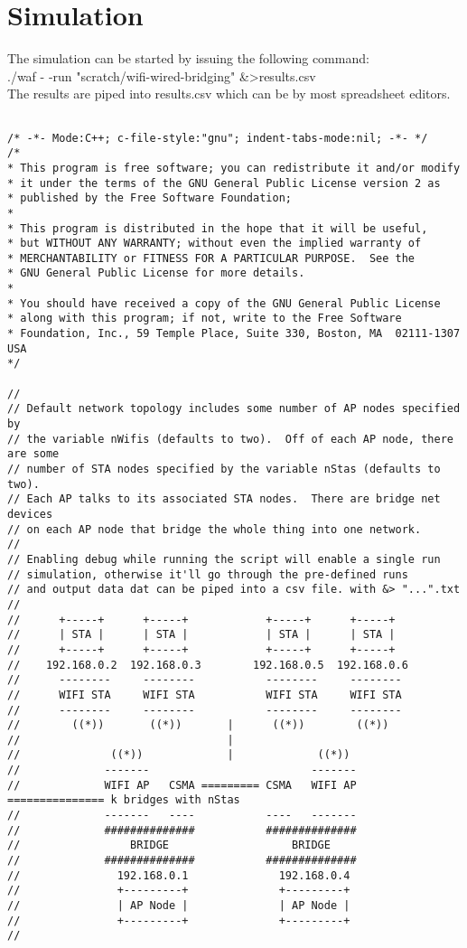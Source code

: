 \chapter{Simulation} 

The simulation can be started by issuing the following command:\\

./waf - -run "scratch/wifi-wired-bridging" \&>results.csv\\

The results are piped into results.csv which can be by most spreadsheet 
editors.

\begin{lstlisting}

/* -*- Mode:C++; c-file-style:"gnu"; indent-tabs-mode:nil; -*- */
/*
* This program is free software; you can redistribute it and/or modify
* it under the terms of the GNU General Public License version 2 as
* published by the Free Software Foundation;
*
* This program is distributed in the hope that it will be useful,
* but WITHOUT ANY WARRANTY; without even the implied warranty of
* MERCHANTABILITY or FITNESS FOR A PARTICULAR PURPOSE.  See the
* GNU General Public License for more details.
*
* You should have received a copy of the GNU General Public License
* along with this program; if not, write to the Free Software
* Foundation, Inc., 59 Temple Place, Suite 330, Boston, MA  02111-1307  USA
*/

//
// Default network topology includes some number of AP nodes specified by
// the variable nWifis (defaults to two).  Off of each AP node, there are some
// number of STA nodes specified by the variable nStas (defaults to two).
// Each AP talks to its associated STA nodes.  There are bridge net devices
// on each AP node that bridge the whole thing into one network.
//
// Enabling debug while running the script will enable a single run
// simulation, otherwise it'll go through the pre-defined runs
// and output data dat can be piped into a csv file. with &> "...".txt
//
//      +-----+      +-----+            +-----+      +-----+
//      | STA |      | STA |            | STA |      | STA | 
//      +-----+      +-----+            +-----+      +-----+
//    192.168.0.2  192.168.0.3        192.168.0.5  192.168.0.6
//      --------     --------           --------     --------
//      WIFI STA     WIFI STA           WIFI STA     WIFI STA
//      --------     --------           --------     --------
//        ((*))       ((*))       |      ((*))        ((*))
//                                |
//              ((*))             |             ((*))
//             -------                         -------
//             WIFI AP   CSMA ========= CSMA   WIFI AP  =============== k bridges with nStas
//             -------   ----           ----   -------
//             ##############           ##############
//                 BRIDGE                   BRIDGE
//             ##############           ############## 
//               192.168.0.1              192.168.0.4
//               +---------+              +---------+
//               | AP Node |              | AP Node |
//               +---------+              +---------+
//


\end{lstlisting}
